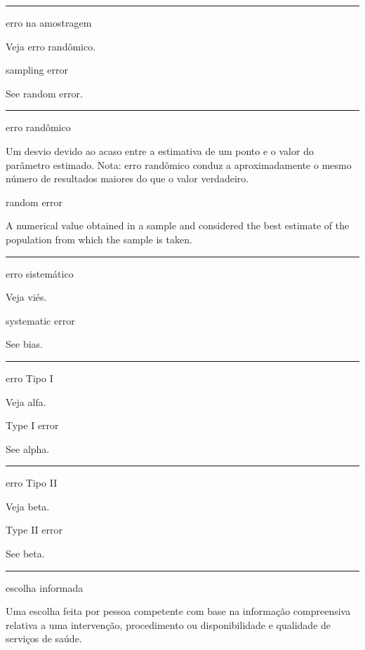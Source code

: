 \documentclass[
]{book}
\begin{document}
\begin{center}\rule{0.5\linewidth}{0.5pt}\end{center}

erro na amostragem

Veja erro randômico.

sampling error

See random error.

\begin{center}\rule{0.5\linewidth}{0.5pt}\end{center}

erro randômico

Um desvio devido ao acaso entre a estimativa de um ponto e o valor do parâmetro estimado. Nota: erro randômico conduz a aproximadamente o mesmo número de resultados maiores do que o valor verdadeiro.

random error

A numerical value obtained in a sample and considered the best estimate of the population from which the sample is taken.

\begin{center}\rule{0.5\linewidth}{0.5pt}\end{center}

erro sistemático

Veja viés.

systematic error

See bias.

\begin{center}\rule{0.5\linewidth}{0.5pt}\end{center}

erro Tipo I

Veja alfa.

Type I error

See alpha.

\begin{center}\rule{0.5\linewidth}{0.5pt}\end{center}

erro Tipo II

Veja beta.

Type II error

See beta.

\begin{center}\rule{0.5\linewidth}{0.5pt}\end{center}

escolha informada

Uma escolha feita por pessoa competente com base na informação compreensiva relativa a uma intervenção, procedimento ou disponibilidade e qualidade de serviços de saúde.
\end{document}
